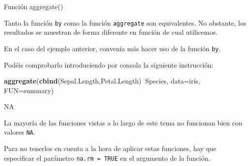 \documentclass[
  ignorenonframetext,
]{beamer}
\newenvironment{Shaded}{\begin{snugshade}}{\end{snugshade}}
\newcommand{\DataTypeTok}[1]{\textcolor[rgb]{0.13,0.29,0.53}{#1}}
\newcommand{\KeywordTok}[1]{\textcolor[rgb]{0.13,0.29,0.53}{\textbf{#1}}}
\newcommand{\NormalTok}[1]{#1}
\newcommand{\OperatorTok}[1]{\textcolor[rgb]{0.81,0.36,0.00}{\textbf{#1}}}
\begin{document}
\begin{frame}[fragile]{Función aggregate()}
\protect\hypertarget{funciuxf3n-aggregate}{}

Tanto la función \texttt{by} como la función \texttt{aggregate} son
equivalentes. No obstante, los resultados se muestran de forma diferente
en función de cual utilicemos.

En el caso del ejemplo anterior, convenía más hacer uso de la función
\texttt{by}.

Podéis comprobarlo introduciendo por consola la siguiente instrucción:

\begin{Shaded}
\begin{Highlighting}[]
\KeywordTok{aggregate}\NormalTok{(}\KeywordTok{cbind}\NormalTok{(Sepal.Length,Petal.Length)}\OperatorTok{~}\NormalTok{Species, }\DataTypeTok{data=}\NormalTok{iris, }\DataTypeTok{FUN=}\NormalTok{summary)}
\end{Highlighting}
\end{Shaded}

\end{frame}

\begin{frame}[fragile]{NA}
\protect\hypertarget{na}{}

La mayoría de las funciones vistas a lo largo de este tema no funcionan
bien con valores \texttt{NA}.

Para no tenerlos en cuenta a la hora de aplicar estas funciones, hay que
especificar el parámetro \texttt{na.rm\ =\ TRUE} en el argumento de la
función.

\end{frame}
\end{document}
